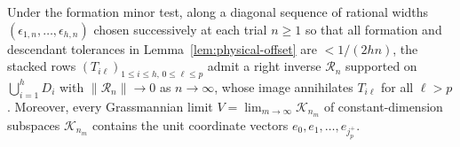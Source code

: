 \begin{lemma}\label{lem:schur-lift}
Under the formation minor test, along a diagonal sequence of rational widths $(\epsilon_{1,n},\dots,\epsilon_{h,n})$ chosen successively at each trial $n\ge 1$ so that all formation and descendant tolerances in Lemma~\ref{lem:physical-offset} are $<1/(2hn)$, the stacked rows $(T_{i\ell})_{1\le i\le h,\,0\le\ell\le p}$ admit a right inverse $\mathcal{R}_n$ supported on $\bigcup_{i=1}^h D_i$ with $\|\mathcal{R}_n\|\to 0$ as $n\to\infty$, whose image annihilates $T_{i\ell}$ for all $\ell>p$. Moreover, every Grassmannian limit $V=\lim_{m\to\infty}\mathcal{K}_{n_m}$ of constant-dimension subspaces $\mathcal{K}_{n_m}$ contains the unit coordinate vectors $e_0,e_1,\dots,e_{j_p^+}$.
\end{lemma}


